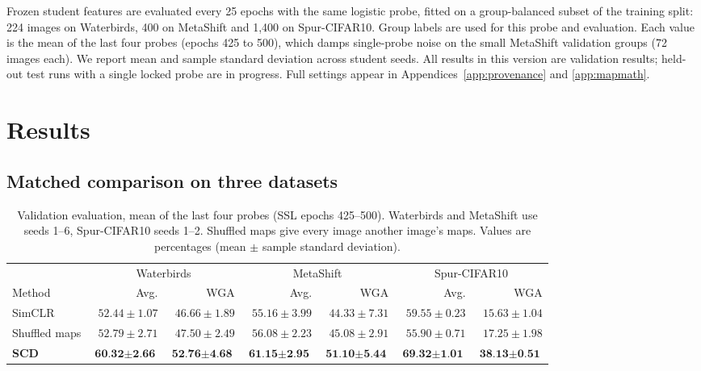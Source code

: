 \documentclass{article}
\begin{document}
Frozen student features are evaluated every 25 epochs with the same logistic probe, fitted on a group-balanced subset of the training split: 224 images on Waterbirds, 400 on MetaShift and 1,400 on Spur-CIFAR10. Group labels are used for this probe and evaluation. Each value is the mean of the last four probes (epochs 425 to 500), which damps single-probe noise on the small MetaShift validation groups (72 images each). We report mean and sample standard deviation across student seeds. All results in this version are validation results; held-out test runs with a single locked probe are in progress. Full settings appear in Appendices~\ref{app:provenance} and \ref{app:mapmath}.

\section{Results}
\subsection{Matched comparison on three datasets}
\begin{table}[htbp]
\centering\small
\setlength{\tabcolsep}{3.5pt}
\caption{Validation evaluation, mean of the last four probes (SSL epochs 425--500). Waterbirds and MetaShift use seeds 1--6, Spur-CIFAR10 seeds 1--2. Shuffled maps give every image another image's maps. Values are percentages (mean $\pm$ sample standard deviation).}
\begin{tabular}{lrrrrrr}
\toprule
& \multicolumn{2}{c}{Waterbirds} & \multicolumn{2}{c}{MetaShift} & \multicolumn{2}{c}{Spur-CIFAR10} \\
Method & Avg. & WGA & Avg. & WGA & Avg. & WGA \\
\midrule
SimCLR & $52.44\pm1.07$ & $46.66\pm1.89$ & $55.16\pm3.99$ & $44.33\pm7.31$ & $59.55\pm0.23$ & $15.63\pm1.04$ \\
Shuffled maps & $52.79\pm2.71$ & $47.50\pm2.49$ & $56.08\pm2.23$ & $45.08\pm2.91$ & $55.90\pm0.71$ & $17.25\pm1.98$ \\
\textbf{SCD} & $\textbf{60.32}\pm\textbf{2.66}$ & $\textbf{52.76}\pm\textbf{4.68}$ & $\textbf{61.15}\pm\textbf{2.95}$ & $\textbf{51.10}\pm\textbf{5.44}$ & $\textbf{69.32}\pm\textbf{1.01}$ & $\textbf{38.13}\pm\textbf{0.51}$ \\
\bottomrule
\end{tabular}
\label{tab:main}
\end{table}
\end{document}
